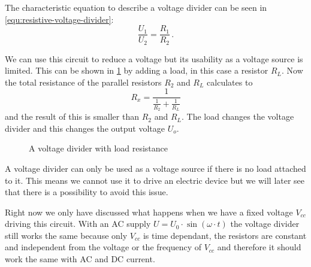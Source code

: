 The characteristic equation to describe a voltage divider can be seen in \cref{equ:resistive-voltage-divider}:
\begin{equation}
	\frac{U_1}{U_2} = \frac{R_1}{R_2}\,.
	\label{equ:resistive-voltage-divider}
\end{equation}

We can use this circuit to reduce a voltage but its usability as a voltage source is limited. This can be shown in \cref{fig:loaded-voltage-divider} by adding a load, in this case a resistor $R_L$. Now the total resistance of the parallel resistors $R_2$ and $R_L$ calculates to
\begin{equation*}
	R_x = \frac{1}{\frac{1}{R_2} + \frac{1}{R_L}}
\end{equation*}
and the result of this is smaller than $R_2$ and $R_L$. The load changes the voltage divider and this changes the output voltage $U_o$.


\begin{figure}[htb]
	\centering
	\caption{A voltage divider with load resistance}
	\label{fig:loaded-voltage-divider}
\end{figure}

A voltage divider can only be used as a voltage source if there is no load attached to it. This means we cannot use it to drive an electric device but we will later see that there is a possibility to avoid this issue.

Right now we only have discussed what happens when we have a fixed voltage $V_{cc}$ driving this circuit. With an AC supply $U = U_0 \cdot \sin(\omega \cdot t)$ the voltage divider still works the same because only $V_{cc}$ is time dependant, the resistors are constant and independent from the voltage or the frequency of $V_{cc}$ and therefore it should work the same with AC and DC current.

